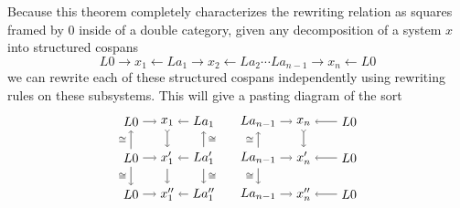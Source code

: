 \documentclass{amsart}
\renewcommand{\gets}{\leftarrow}
\theoremstyle{remark}
\theoremstyle{definition}
\begin{document}
Because this theorem completely characterizes the rewriting relation
as squares framed by $ 0 $ inside of a double category, given any
decomposition of a system $ x $ into structured cospans
%
\[
  L0 \to x_1 \gets La_1 \to x_2 \gets La_2 \dotsm La_{n-1} \to x_n
  \gets L0
\]
%
we can rewrite each of these structured cospans independently using
rewriting rules on these subsystems. This will give a pasting diagram
of the sort
%
\[
  \begin{tikzpicture}
    \begin{scope}[shift={(0,3)}]
      \node (1) at (0,2) {$ L0 $};
      \node (2) at (1,2) {$ x_1 $};
      \node (3) at (2,2) {$ La_1 $};
      \node (4) at (0,1) {$ L0 $};
      \node (5) at (1,1) {$ x'_1 $};
      \node (6) at (2,1) {$ La'_1 $};
      \node (7) at (0,0) {$ L0 $};
      \node (8) at (1,0) {$ x''_1 $};
      \node (9) at (2,0) {$ La''_1 $};
      \draw [->] (1) to node [] {\scriptsize{$  $}} (2);
      \draw [->] (3) to node [] {\scriptsize{$  $}} (2);
      \draw [->] (4) to node [] {\scriptsize{$  $}} (5);
      \draw [->] (6) to node [] {\scriptsize{$  $}} (5);
      \draw [->] (7) to node [] {\scriptsize{$  $}} (8);
      \draw [->] (9) to node [] {\scriptsize{$  $}} (8);
      \draw [->] (4) to node [left] {\scriptsize{$ \cong $}} (1);
      \draw [->] (4) to node [left] {\scriptsize{$ \cong $}} (7);
      \draw [>->] (2) to node [] {\scriptsize{$  $}} (5);
      \draw [->] (5) to node [] {\scriptsize{$  $}} (8);
      \draw [->] (6) to node [right] {\scriptsize{$ \cong  $}} (3);
      \draw [->] (6) to node [right] {\scriptsize{$ \cong $}} (9);
    \end{scope}
    \begin{scope}[shift={(3.5,3)}]
      \node (1) at (0,2) {$ La_{n-1} $};
      \node (2) at (1.25,2) {$ x_n $};
      \node (3) at (2.5,2) {$ L0 $};
      \node (4) at (0,1) {$ La_{n-1} $};
      \node (5) at (1.25,1) {$ x'_n $};
      \node (6) at (2.5,1) {$ L0 $};
      \node (7) at (0,0) {$ La_{n-1} $};
      \node (8) at (1.25,0) {$ x''_n $};
      \node (9) at (2.5,0) {$ L0 $};
       \draw [->] (1) to node [] {\scriptsize{$  $}} (2);
      \draw [->] (3) to node [] {\scriptsize{$  $}} (2);
      \draw [->] (4) to node [] {\scriptsize{$  $}} (5);
      \draw [->] (6) to node [] {\scriptsize{$  $}} (5);
      \draw [->] (7) to node [] {\scriptsize{$  $}} (8);
      \draw [->] (9) to node [] {\scriptsize{$  $}} (8);
      \draw [->] (4) to node [left] {\scriptsize{$ \cong $}} (1);
      \draw [->] (4) to node [left] {\scriptsize{$ \cong $}} (7);
      \draw [>->] (2) to node [] {\scriptsize{$  $}} (5);

\end{scope}
\end{tikzpicture}\]
\end{document}
